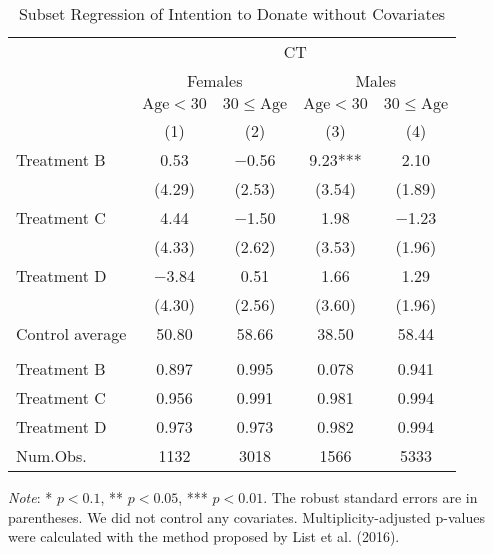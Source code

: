 \documentclass[12pt, a4paper]{article}
\begin{document}
\begin{table}[H]

\caption{\label{tab:int-lm-subset1}Subset Regression of Intention to Donate without Covariates}
\centering
\fontsize{8}{10}\selectfont
\begin{threeparttable}
\begin{tabular}[t]{lcccc}
\toprule
\multicolumn{1}{c}{ } & \multicolumn{4}{c}{CT} \\
\cmidrule(l{3pt}r{3pt}){2-5}
\multicolumn{1}{c}{ } & \multicolumn{2}{c}{Females} & \multicolumn{2}{c}{Males} \\
\cmidrule(l{3pt}r{3pt}){2-3} \cmidrule(l{3pt}r{3pt}){4-5}
\multicolumn{1}{c}{ } & \multicolumn{1}{c}{$\text{Age} < 30$} & \multicolumn{1}{c}{$30 \le \text{Age}$} & \multicolumn{1}{c}{$\text{Age} < 30$} & \multicolumn{1}{c}{$30 \le \text{Age}$} \\
\cmidrule(l{3pt}r{3pt}){2-2} \cmidrule(l{3pt}r{3pt}){3-3} \cmidrule(l{3pt}r{3pt}){4-4} \cmidrule(l{3pt}r{3pt}){5-5}
  & (1) & (2) & (3) & (4)\\
\midrule
Treatment B & \num{0.53} & \num{-0.56} & \num{9.23}*** & \num{2.10}\\
 & (\num{4.29}) & (\num{2.53}) & (\num{3.54}) & (\num{1.89})\\
Treatment C & \num{4.44} & \num{-1.50} & \num{1.98} & \num{-1.23}\\
 & (\num{4.33}) & (\num{2.62}) & (\num{3.53}) & (\num{1.96})\\
Treatment D & \num{-3.84} & \num{0.51} & \num{1.66} & \num{1.29}\\
 & (\num{4.30}) & (\num{2.56}) & (\num{3.60}) & (\num{1.96})\\
\midrule
Control average & 50.80 & 58.66 & 38.50 & 58.44\\
\addlinespace[0.3em]
\multicolumn{5}{l}{\textit{Multiplicity-adjusted p-values}}\\
\hspace{1em}Treatment B & 0.897 & 0.995 & 0.078 & 0.941\\
\hspace{1em}Treatment C & 0.956 & 0.991 & 0.981 & 0.994\\
\hspace{1em}Treatment D & 0.973 & 0.973 & 0.982 & 0.994\\
Num.Obs. & \num{1132} & \num{3018} & \num{1566} & \num{5333}\\
\bottomrule
\end{tabular}
\begin{tablenotes}
\item \emph{Note}: * $p < 0.1$, ** $p < 0.05$, *** $p < 0.01$. The robust standard errors are in parentheses. We did not control any covariates. Multiplicity-adjusted p-values were calculated with the method proposed by List et al. (2016).
\end{tablenotes}
\end{threeparttable}
\end{table}
\end{document}
